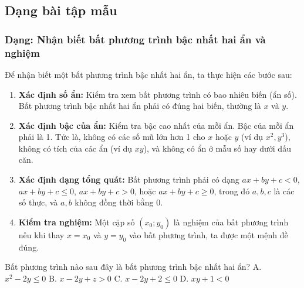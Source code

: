 

\subsection{Dạng bài tập mẫu}
\subsubsection{Dạng: Nhận biết bất phương trình bậc nhất hai ẩn và nghiệm}
\begin{phuongphap}
Để nhận biết một bất phương trình bậc nhất hai ẩn, ta thực hiện các bước sau:
\begin{enumerate}
    \item \textbf{Xác định số ẩn:} Kiểm tra xem bất phương trình có bao nhiêu biến (ẩn số). Bất phương trình bậc nhất hai ẩn phải có đúng hai biến, thường là $x$ và $y$.
    \item \textbf{Xác định bậc của ẩn:} Kiểm tra bậc cao nhất của mỗi ẩn. Bậc của mỗi ẩn phải là 1. Tức là, không có các số mũ lớn hơn 1 cho $x$ hoặc $y$ (ví dụ $x^2, y^3$), không có tích của các ẩn (ví dụ $xy$), và không có ẩn ở mẫu số hay dưới dấu căn.
    \item \textbf{Xác định dạng tổng quát:} Bất phương trình phải có dạng $ax+by+c < 0$, $ax+by+c \le 0$, $ax+by+c > 0$, hoặc $ax+by+c \ge 0$, trong đó $a, b, c$ là các số thực, và $a, b$ không đồng thời bằng 0.
    \item \textbf{Kiểm tra nghiệm:} Một cặp số $(x_0; y_0)$ là nghiệm của bất phương trình nếu khi thay $x=x_0$ và $y=y_0$ vào bất phương trình, ta được một mệnh đề đúng.
\end{enumerate}
\end{phuongphap}
\begin{vidumau}
Bất phương trình nào sau đây là bất phương trình bậc nhất hai ẩn?
\choice
A. $x^2 - 2y \le 0$
B. $x - 2y + z > 0$
C. $x - 2y + 2 \le 0$ \True
D. $xy + 1 < 0$
\end{vidumau}

